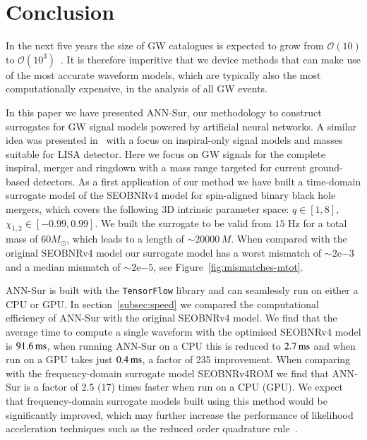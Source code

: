 \documentclass[aps,prd,reprint,superscriptaddress,preprintnumbers,showpacs,nofootinbib]{revtex4-1}
\newcommand{\expnumber}[2]{{#1}\mathrm{e}{#2}}
\begin{document}
\section{Conclusion}
\label{sec:conclusion}

In the next five years the size of GW catalogues is expected to grow from
$\mathcal{O}(10)$ to $\mathcal{O}(10^3)$~\cite{Baibhav2019GravitationalwaveDR,
Aasi:2013wya}. It is therefore imperitive that we device methods that can make use of
the most accurate waveform models, which are typically also the most
computationally expensive, in the analysis of all GW events.

In this paper we have presented ANN-Sur, our methodology to construct surrogates
for GW signal models powered by artificial neural networks. A similar idea was
presented in~\cite{PhysRevLett.122.211101} with a focus on inspiral-only signal
models and masses suitable for LISA detector. Here we focus on GW signals for
the complete inspiral, merger and ringdown with a mass range targeted for
current ground-based detectors. As a first application of our method we have
built a time-domain surrogate model of the SEOBNRv4 model for spin-aligned
binary black hole mergers, which covers the following 3D intrinsic parameter
space: $q \in [1, 8]$, $\chi_{1,2} \in [-0.99, 0.99]$. We built the surrogate to
be valid from $15$ Hz for a total mass of $60 M_\odot$, which leads to a length
of $\sim 20000 \, M$. When compared with the original SEOBNRv4 model our
surrogate model has a worst mismatch of $\sim \expnumber{2}{-3}$ and a median
mismatch of $\sim \expnumber{2}{-5}$, see Figure~\ref{fig:mismatches-mtot}.

ANN-Sur is built with the {\tt TensorFlow} library and can seamlessly run on
either a CPU or GPU. In section~\ref{subsec:speed} we compared the computational
efficiency of ANN-Sur with the original SEOBNRv4 model. We find that the average
time to compute a single waveform with the optimised SEOBNRv4 model is $91.6 \,
{\rm{ms}}$, when running ANN-Sur on a CPU this is reduced to $2.7 \, {\rm{ms}}$
and when run on a GPU takes just $0.4 \, {\rm{ms}}$, a factor of 235
improvement. When comparing with the frequency-domain surrogate model
SEOBNRv4ROM we find that ANN-Sur is a factor of 2.5 (17) times faster when run
on a CPU (GPU). We expect that frequency-domain surrogate models built using
this method would be significantly improved, which may further increase the
performance of likelihood acceleration techniques such as the reduced order
quadrature
rule~\cite{Canizares2015AcceleratedGW,PhysRevD.94.044031,Morisaki2020RapidPE}.
\end{document}
